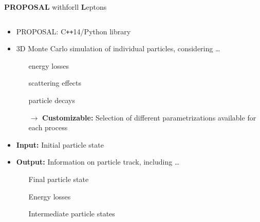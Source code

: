 \begin{frame}{}
  \vspace{-3cm}
  \begin{minipage}[t][1cm][t]{\textwidth}
  {\huge \textbf{PROPOSAL}} {\huge\textbf{\rightarrow}}
  \colorbox{tugreen}{}{\Large with}\colorbox{tugreen}{}{\Large for}\colorbox{tugreen}{ll {\huge \textbf{L}}{\Large eptons}}
  \end{minipage}
  \begin{minipage}[t][1cm][t]{\textwidth}
  \vspace{-5mm}
    \begin{columns}[onlytextwidth]
        \begin{column}{0.5\textwidth}
            \begin{itemize}
              \item PROPOSAL: C\texttt{++}14/Python library
              \item 3D Monte Carlo simulation of individual particles, considering \ldots
              \begin{itemize}
                \item[\normalcolor{\ldots}] energy losses
                \item[\normalcolor{\ldots}] scattering effects
                \item[\normalcolor{\ldots}] particle decays
                \item[$\rightarrow$] \textbf{Customizable:} Selection of different parametrizations available for each process
              \end{itemize}
              \item \textbf{Input:} Initial particle state
              \item \textbf{Output:} Information on particle track, including \ldots
              \begin{itemize}
                \item[\normalcolor{\ldots}] Final particle state
                \item[\normalcolor{\ldots}] Energy losses
                \item[\normalcolor{\ldots}] Intermediate particle states
              \end{itemize}

\end{itemize}
\end{column}
\end{columns}
\end{minipage}
\end{frame}
